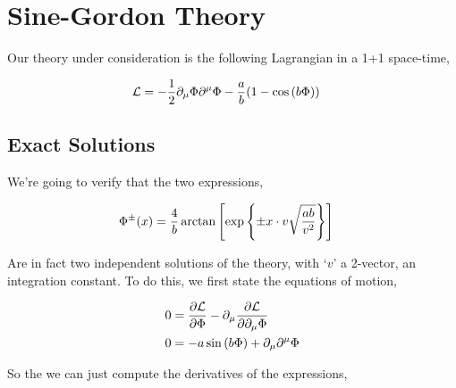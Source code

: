 \section{Sine-Gordon Theory}

Our theory under consideration is the following Lagrangian in a 1+1 space-time,

\begin{align}
    \mathcal L&=-\frac12\partial_\mu \Phi\partial^\mu\Phi-\frac ab\qty(1-\cos\qty(b\Phi))\nonumber
\end{align}

\subsection{Exact Solutions}

We're going to verify that the two expressions,

\begin{align}
    \Phi^{\pm}\qty(x)&=\frac4b\arctan\qty[\exp\qty{\pm x\cdot v\sqrt{\frac{ab}{v^2}}}]\nonumber
\end{align}

Are in fact two independent solutions of the theory, with `$v$' a 2-vector, an integration constant. 
To do this, we first state the equations of motion,

\begin{align}
    0&=\pdv{\mathcal L}{\Phi}-\partial_\mu\pdv{\mathcal L}{\partial_\mu\Phi}\nonumber\\
    0&=-a\sin\qty(b\Phi)+\partial_\mu\partial^\mu\Phi\nonumber
\end{align}

So the we can just compute the derivatives of the expressions,

